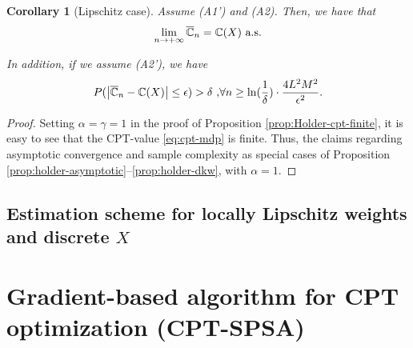 \documentclass[11pt,letterpaper,english]{article}
\newtheorem{corollary}[theorem]{Corollary}
\begin{document}
\begin{corollary}[Lipschitz case]
Assume (A1') and (A2). Then, we have that 
$$\lim_{n\rightarrow +\infty} \overline {\mathbb{C}}_n = \mathbb{C}(X) \text{   a.s.}$$

In addition, if we assume (A2'), we have 
$$
P(\left |\overline {\mathbb{C}}_n- \mathbb{C}(X) \right| \leq  \epsilon ) > \delta\text{     ,} \forall n \geq \ln(\frac{1}{\delta})\cdot 
\frac{4L^2 M^2}{\epsilon^{2}}.
$$
\end{corollary}
\begin{proof}
 Setting $\alpha=\gamma=1$ in the proof of Proposition \ref{prop:Holder-cpt-finite}, it is easy to see that the CPT-value \eqref{eq:cpt-mdp} is finite. Thus, the claims regarding asymptotic convergence and sample complexity as special cases of Proposition \ref{prop:holder-asymptotic}--\ref{prop:holder-dkw}, with $\alpha=1$. 
\end{proof}



\subsection{Estimation scheme for locally Lipschitz weights and discrete $X$}

\section{Gradient-based algorithm for CPT optimization (CPT-SPSA)}
\label{sec:1spsa}
\end{document}

